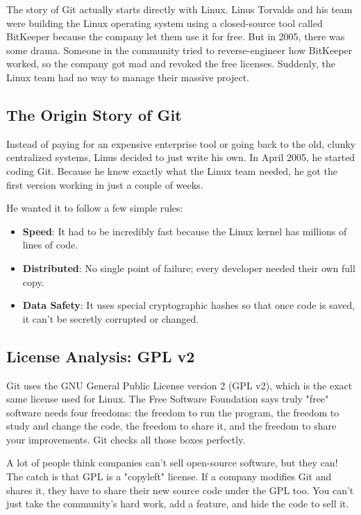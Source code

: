 \documentclass[12pt,a4paper]{report}
\begin{document}
The story of Git actually starts directly with Linux. Linus Torvalds and his team were building the Linux operating system using a closed-source tool called BitKeeper because the company let them use it for free. But in 2005, there was some drama. Someone in the community tried to reverse-engineer how BitKeeper worked, so the company got mad and revoked the free licenses. Suddenly, the Linux team had no way to manage their massive project.

\subsection{The Origin Story of Git}
Instead of paying for an expensive enterprise tool or going back to the old, clunky centralized systems, Linus decided to just write his own. In April 2005, he started coding Git. Because he knew exactly what the Linux team needed, he got the first version working in just a couple of weeks. 

He wanted it to follow a few simple rules:
\begin{itemize}
    \item \textbf{Speed}: It had to be incredibly fast because the Linux kernel has millions of lines of code.
    \item \textbf{Distributed}: No single point of failure; every developer needed their own full copy.
    \item \textbf{Data Safety}: It uses special cryptographic hashes so that once code is saved, it can't be secretly corrupted or changed.
\end{itemize}

\subsection{License Analysis: GPL v2}
Git uses the GNU General Public License version 2 (GPL v2), which is the exact same license used for Linux. The Free Software Foundation says truly "free" software needs four freedoms: the freedom to run the program, the freedom to study and change the code, the freedom to share it, and the freedom to share your improvements. Git checks all those boxes perfectly. 

A lot of people think companies can't sell open-source software, but they can! The catch is that GPL is a "copyleft" license. If a company modifies Git and shares it, they have to share their new source code under the GPL too. You can't just take the community's hard work, add a feature, and hide the code to sell it. 
\end{document}
